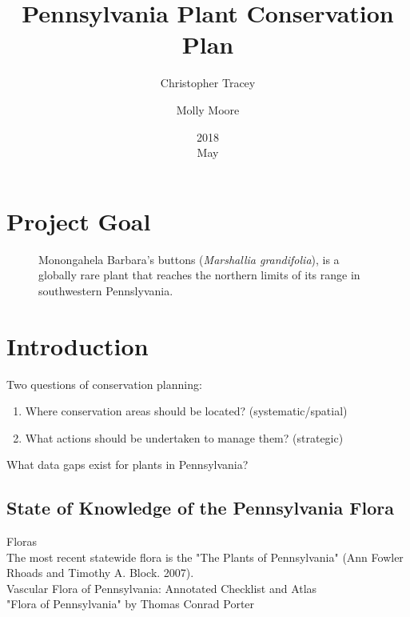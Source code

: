 \documentclass{article}
\title{Pennsylvania Plant Conservation Plan}
\date{2018\\ May}
\author{Christopher Tracey 
\and Molly Moore}
\begin{document}
\maketitle


\newpage




\tableofcontents
\newpage

\section{Project Goal}

\begin{wrapfigure}{R}{3in}
 \begin{center}
   \setlength{\fboxsep}{0pt}%
   \setlength{\fboxrule}{0.5pt}%
 \end{center}
 \caption{Monongahela Barbara's buttons (\textit{Marshallia grandifolia}), is a globally rare plant that reaches the northern limits of its range in southwestern Pennslyvania.}
\end{wrapfigure}

\noindent\normalsize
\blindtext

\section{Introduction}
\noindent\normalsize
Two questions of conservation planning:
\begin{enumerate}
 \item Where conservation areas should be located? (systematic/spatial)
 \item What actions should be undertaken to manage them? (strategic)
\end{enumerate}

What data gaps exist for plants in Pennsylvania?

\subsection{State of Knowledge of the Pennsylvania Flora}

Floras\\
The most recent statewide flora is the "The Plants of Pennsylvania" (Ann Fowler Rhoads and Timothy A. Block. 2007).\\
Vascular Flora of Pennsylvania: Annotated Checklist and Atlas\\
"Flora of Pennsylvania" by Thomas Conrad Porter
\end{document}
